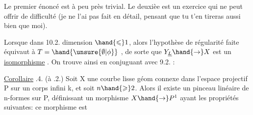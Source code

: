 Le premier énoncé est à peu près trivial. Le deuxièe est un
exercice qui ne peut offrir de difficulté (je ne l'ai pas fait en
détail, pensant que tu t'en tireras aussi bien que moi).

Lorsque dans 10.2.   dimension $\hand{\leqslant}1$,
alors l'hypothèse de régularité faite équivaut à $T = \hand{\unsure{\emptyset|\phi}}$ , de sorte
que $Y_{\underline{L}}\hand{\to} X$ est un \uline{isomorphisme} . On trouve ainsi\hand{;} en conjuguant
avec 9.2. :

\uline{Corollaire} .4. (à .2.) Soit X une courbe lisse géom connexe dans
 l'espace projectif P sur un corps infini k, et soit $n\hand{\geqslant}2$.
Alors il existe un pinceau linéaire de n-formes sur P, définissant un
morphisme $X\hand{\to}P^1$ ayant les propriétés suivantes: ce morphisme est

